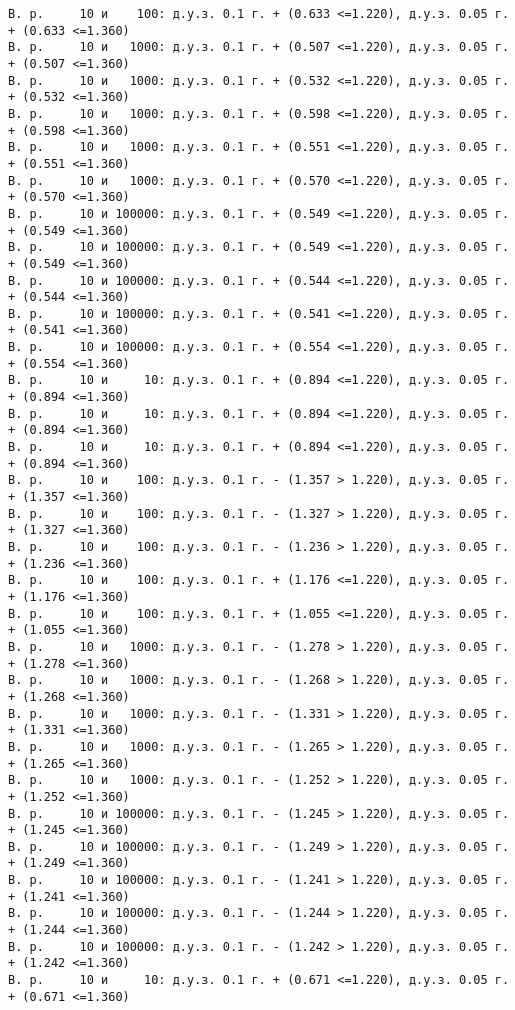 \documentclass[11pt]{article}
\begin{document}
{\begin{Verbatim}[commandchars=\\\{\}]
В. р.     10 и    100: д.у.з. 0.1 г. + (0.633 <=1.220), д.у.з. 0.05 г. + (0.633 <=1.360)
В. р.     10 и   1000: д.у.з. 0.1 г. + (0.507 <=1.220), д.у.з. 0.05 г. + (0.507 <=1.360)
В. р.     10 и   1000: д.у.з. 0.1 г. + (0.532 <=1.220), д.у.з. 0.05 г. + (0.532 <=1.360)
В. р.     10 и   1000: д.у.з. 0.1 г. + (0.598 <=1.220), д.у.з. 0.05 г. + (0.598 <=1.360)
В. р.     10 и   1000: д.у.з. 0.1 г. + (0.551 <=1.220), д.у.з. 0.05 г. + (0.551 <=1.360)
В. р.     10 и   1000: д.у.з. 0.1 г. + (0.570 <=1.220), д.у.з. 0.05 г. + (0.570 <=1.360)
В. р.     10 и 100000: д.у.з. 0.1 г. + (0.549 <=1.220), д.у.з. 0.05 г. + (0.549 <=1.360)
В. р.     10 и 100000: д.у.з. 0.1 г. + (0.549 <=1.220), д.у.з. 0.05 г. + (0.549 <=1.360)
В. р.     10 и 100000: д.у.з. 0.1 г. + (0.544 <=1.220), д.у.з. 0.05 г. + (0.544 <=1.360)
В. р.     10 и 100000: д.у.з. 0.1 г. + (0.541 <=1.220), д.у.з. 0.05 г. + (0.541 <=1.360)
В. р.     10 и 100000: д.у.з. 0.1 г. + (0.554 <=1.220), д.у.з. 0.05 г. + (0.554 <=1.360)
В. р.     10 и     10: д.у.з. 0.1 г. + (0.894 <=1.220), д.у.з. 0.05 г. + (0.894 <=1.360)
В. р.     10 и     10: д.у.з. 0.1 г. + (0.894 <=1.220), д.у.з. 0.05 г. + (0.894 <=1.360)
В. р.     10 и     10: д.у.з. 0.1 г. + (0.894 <=1.220), д.у.з. 0.05 г. + (0.894 <=1.360)
В. р.     10 и    100: д.у.з. 0.1 г. - (1.357 > 1.220), д.у.з. 0.05 г. + (1.357 <=1.360)
В. р.     10 и    100: д.у.з. 0.1 г. - (1.327 > 1.220), д.у.з. 0.05 г. + (1.327 <=1.360)
В. р.     10 и    100: д.у.з. 0.1 г. - (1.236 > 1.220), д.у.з. 0.05 г. + (1.236 <=1.360)
В. р.     10 и    100: д.у.з. 0.1 г. + (1.176 <=1.220), д.у.з. 0.05 г. + (1.176 <=1.360)
В. р.     10 и    100: д.у.з. 0.1 г. + (1.055 <=1.220), д.у.з. 0.05 г. + (1.055 <=1.360)
В. р.     10 и   1000: д.у.з. 0.1 г. - (1.278 > 1.220), д.у.з. 0.05 г. + (1.278 <=1.360)
В. р.     10 и   1000: д.у.з. 0.1 г. - (1.268 > 1.220), д.у.з. 0.05 г. + (1.268 <=1.360)
В. р.     10 и   1000: д.у.з. 0.1 г. - (1.331 > 1.220), д.у.з. 0.05 г. + (1.331 <=1.360)
В. р.     10 и   1000: д.у.з. 0.1 г. - (1.265 > 1.220), д.у.з. 0.05 г. + (1.265 <=1.360)
В. р.     10 и   1000: д.у.з. 0.1 г. - (1.252 > 1.220), д.у.з. 0.05 г. + (1.252 <=1.360)
В. р.     10 и 100000: д.у.з. 0.1 г. - (1.245 > 1.220), д.у.з. 0.05 г. + (1.245 <=1.360)
В. р.     10 и 100000: д.у.з. 0.1 г. - (1.249 > 1.220), д.у.з. 0.05 г. + (1.249 <=1.360)
В. р.     10 и 100000: д.у.з. 0.1 г. - (1.241 > 1.220), д.у.з. 0.05 г. + (1.241 <=1.360)
В. р.     10 и 100000: д.у.з. 0.1 г. - (1.244 > 1.220), д.у.з. 0.05 г. + (1.244 <=1.360)
В. р.     10 и 100000: д.у.з. 0.1 г. - (1.242 > 1.220), д.у.з. 0.05 г. + (1.242 <=1.360)
В. р.     10 и     10: д.у.з. 0.1 г. + (0.671 <=1.220), д.у.з. 0.05 г. + (0.671 <=1.360)

\end{Verbatim}}
\end{document}
